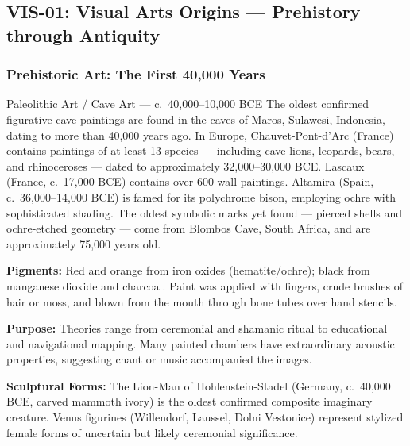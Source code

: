 \documentclass[11pt,letterpaper]{article}
\begin{document}
\subsection{VIS-01: Visual Arts Origins --- Prehistory through Antiquity}

\subsubsection{Prehistoric Art: The First 40,000 Years}

\begin{erabox}{Paleolithic Art / Cave Art --- c.~40,000--10,000 BCE}
The oldest confirmed figurative cave paintings are found in the caves of Maros, Sulawesi, Indonesia, dating to more than 40,000 years ago. In Europe, Chauvet-Pont-d'Arc (France) contains paintings of at least 13 species --- including cave lions, leopards, bears, and rhinoceroses --- dated to approximately 32,000--30,000 BCE. Lascaux (France, c.~17,000 BCE) contains over 600 wall paintings. Altamira (Spain, c.~36,000--14,000 BCE) is famed for its polychrome bison, employing ochre with sophisticated shading. The oldest symbolic marks yet found --- pierced shells and ochre-etched geometry --- come from Blombos Cave, South Africa, and are approximately 75,000 years old.

\textbf{Pigments:} Red and orange from iron oxides (hematite/ochre); black from manganese dioxide and charcoal. Paint was applied with fingers, crude brushes of hair or moss, and blown from the mouth through bone tubes over hand stencils.

\textbf{Purpose:} Theories range from ceremonial and shamanic ritual to educational and navigational mapping. Many painted chambers have extraordinary acoustic properties, suggesting chant or music accompanied the images.

\textbf{Sculptural Forms:} The Lion-Man of Hohlenstein-Stadel (Germany, c.~40,000 BCE, carved mammoth ivory) is the oldest confirmed composite imaginary creature. Venus figurines (Willendorf, Laussel, Dolni Vestonice) represent stylized female forms of uncertain but likely ceremonial significance.
\end{erabox}
\end{document}

